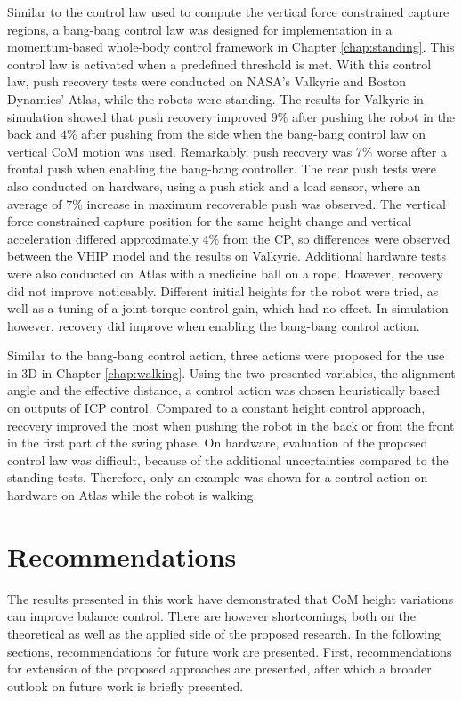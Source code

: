 Similar to the control law used to compute the vertical force constrained capture regions, a bang-bang control law was designed for implementation in a momentum-based whole-body control framework in Chapter \ref{chap:standing}. This control law is activated when a predefined threshold is met. With this control law, push recovery tests were conducted on NASA's Valkyrie and Boston Dynamics' Atlas, while the robots were standing. The results for Valkyrie in simulation showed that push recovery improved $9$\% after pushing the robot in the back and $4$\% after pushing from the side when the bang-bang control law on vertical \ac{CoM} motion was used. Remarkably, push recovery was $7$\% worse after a frontal push when enabling the bang-bang controller. The rear push tests were also conducted on hardware, using a push stick and a load sensor, where an average of $7$\% increase in maximum recoverable push was observed. The vertical force constrained capture position for the same height change and vertical acceleration differed approximately $4$\% from the \ac{CP}, so differences were observed between the \ac{VHIP} model and the results on Valkyrie. Additional hardware tests were also conducted on Atlas with a medicine ball on a rope. However, recovery did not improve noticeably. Different initial heights for the robot were tried, as well as a tuning of a joint torque control gain, which had no effect. In simulation however, recovery did improve when enabling the bang-bang control action.

Similar to the bang-bang control action, three actions were proposed for the use in \ac{3D} in Chapter \ref{chap:walking}. Using the two presented variables, the alignment angle and the effective distance, a control action was chosen heuristically based on outputs of \ac{ICP} control. Compared to a constant height control approach, recovery improved the most when pushing the robot in the back or from the front in the first part of the swing phase. On hardware, evaluation of the proposed control law was difficult, because of the additional uncertainties compared to the standing tests. Therefore, only an example was shown for a control action on hardware on Atlas while the robot is walking.

\section{Recommendations}
The results presented in this work have demonstrated that \ac{CoM} height variations can improve balance control. There are however shortcomings, both on the theoretical as well as the applied side of the proposed research. In the following sections, recommendations for future work are presented. First, recommendations for extension of the proposed approaches are presented, after which a broader outlook on future work is briefly presented.
